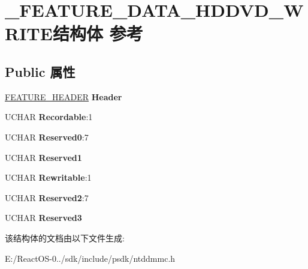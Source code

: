\hypertarget{struct___f_e_a_t_u_r_e___d_a_t_a___h_d_d_v_d___w_r_i_t_e}{}\section{\+\_\+\+F\+E\+A\+T\+U\+R\+E\+\_\+\+D\+A\+T\+A\+\_\+\+H\+D\+D\+V\+D\+\_\+\+W\+R\+I\+T\+E结构体 参考}
\label{struct___f_e_a_t_u_r_e___d_a_t_a___h_d_d_v_d___w_r_i_t_e}
\subsection*{Public 属性}
\begin{DoxyCompactItemize}
\item 
\mbox{\label{struct___f_e_a_t_u_r_e___d_a_t_a___h_d_d_v_d___w_r_i_t_e_a0cc75457cf24cfd168bbc137f8b3c991}} 
\hyperlink{struct___f_e_a_t_u_r_e___h_e_a_d_e_r}{F\+E\+A\+T\+U\+R\+E\+\_\+\+H\+E\+A\+D\+ER} {\bfseries Header}
\item 
\mbox{\label{struct___f_e_a_t_u_r_e___d_a_t_a___h_d_d_v_d___w_r_i_t_e_a86bb2012ae7c139d154f70c178df19d0}} 
U\+C\+H\+AR {\bfseries Recordable}\+:1
\item 
\mbox{\label{struct___f_e_a_t_u_r_e___d_a_t_a___h_d_d_v_d___w_r_i_t_e_a00b744b9d7eed64531909fd82e4b2d53}} 
U\+C\+H\+AR {\bfseries Reserved0}\+:7
\item 
\mbox{\label{struct___f_e_a_t_u_r_e___d_a_t_a___h_d_d_v_d___w_r_i_t_e_a8da9b317e30fbbbc1db21dc60df36db5}} 
U\+C\+H\+AR {\bfseries Reserved1}
\item 
\mbox{\label{struct___f_e_a_t_u_r_e___d_a_t_a___h_d_d_v_d___w_r_i_t_e_a03fcbb42fbe13ce274f33f1f8b3a665f}} 
U\+C\+H\+AR {\bfseries Rewritable}\+:1
\item 
\mbox{\label{struct___f_e_a_t_u_r_e___d_a_t_a___h_d_d_v_d___w_r_i_t_e_ab45cd4d52bf572ed60324fbc9816e8e8}} 
U\+C\+H\+AR {\bfseries Reserved2}\+:7
\item 
\mbox{\label{struct___f_e_a_t_u_r_e___d_a_t_a___h_d_d_v_d___w_r_i_t_e_a06092595f8e1f673075a872748a2c2c6}} 
U\+C\+H\+AR {\bfseries Reserved3}
\end{DoxyCompactItemize}


该结构体的文档由以下文件生成\+:\begin{DoxyCompactItemize}
\item 
E\+:/\+React\+O\+S-\/0../sdk/include/psdk/ntddmmc.\+h\end{DoxyCompactItemize}
